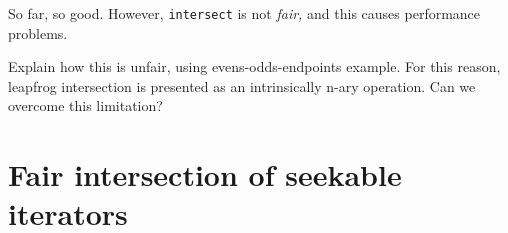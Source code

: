 \documentclass[acmsmall,screen,review,anonymous,dvipsnames]{acmart}
\newcommand\todo[1]{{\color{Orange}#1}}
\begin{document}
\noindent
So far, so good.
However, \texttt{intersect} is not \emph{fair,} and this causes performance problems.

\noindent
\todo{Explain how this is unfair, using evens-odds-endpoints example.
  For this reason, leapfrog intersection is presented as an intrinsically n-ary operation.
  Can we overcome this limitation?
}






\section{Fair intersection of seekable iterators}
\end{document}
